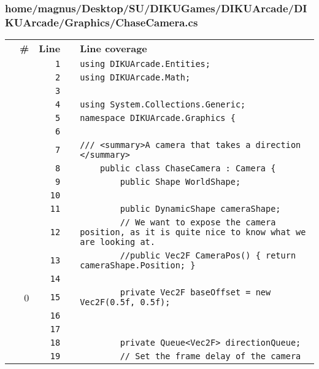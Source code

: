 \documentclass[a4paper,landscape,10pt]{article}
\begin{document}
\subsubsection{home/magnus/Desktop/SU/DIKUGames/DIKUArcade/DIKUArcade/Graphics/ChaseCamera.cs}
\begin{longtable}[l]{lrrll}
\textbf{} & \textbf{\#} & \textbf{Line} & \textbf{} & \textbf{Line coverage}\\
\cellcolor{gray} &  & \verb~1~ & & \verb~using DIKUArcade.Entities;~\\
\cellcolor{gray} &  & \verb~2~ & & \verb~using DIKUArcade.Math;~\\
\cellcolor{gray} &  & \verb~3~ & & \verb~~\\
\cellcolor{gray} &  & \verb~4~ & & \verb~using System.Collections.Generic;~\\
\cellcolor{gray} &  & \verb~5~ & & \verb~namespace DIKUArcade.Graphics {~\\
\cellcolor{gray} &  & \verb~6~ & & \verb~~\\
\cellcolor{gray} &  & \verb~7~ & & \verb~/// <summary>A camera that takes a direction </summary>~\\
\cellcolor{gray} &  & \verb~8~ & & \verb~    public class ChaseCamera : Camera {~\\
\cellcolor{gray} &  & \verb~9~ & & \verb~        public Shape WorldShape;~\\
\cellcolor{gray} &  & \verb~10~ & & \verb~~\\
\cellcolor{gray} &  & \verb~11~ & & \verb~        public DynamicShape cameraShape;~\\
\cellcolor{gray} &  & \verb~12~ & & \verb~        // We want to expose the camera position, as it is quite nice to know what we are looking at.~\\
\cellcolor{gray} &  & \verb~13~ & & \verb~        //public Vec2F CameraPos() { return cameraShape.Position; }~\\
\cellcolor{gray} &  & \verb~14~ & & \verb~~\\
\cellcolor{red} & 0 & \verb~15~ & & \verb~        private Vec2F baseOffset = new Vec2F(0.5f, 0.5f);~\\
\cellcolor{gray} &  & \verb~16~ & & \verb~~\\
\cellcolor{gray} &  & \verb~17~ & & \verb~~\\
\cellcolor{gray} &  & \verb~18~ & & \verb~        private Queue<Vec2F> directionQueue;~\\
\cellcolor{gray} &  & \verb~19~ & & \verb~        // Set the frame delay of the camera~\\

\end{longtable}
\end{document}
